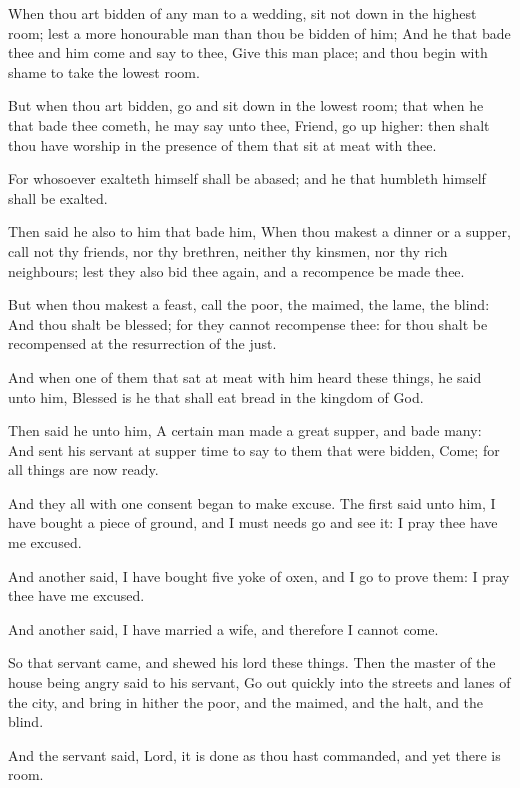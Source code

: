 \Verse When thou art bidden of any man to a wedding, sit not down in the highest room; lest a more honourable man than thou be bidden of him; \Verse And he that bade thee and him come and say to thee, Give this man place; and thou begin with shame to take the lowest room.

\Verse But when thou art bidden, go and sit down in the lowest room; that when he that bade thee cometh, he may say unto thee, Friend, go up higher: then shalt thou have worship in the presence of them that sit at meat with thee.

\Verse For whosoever exalteth himself shall be abased; and he that humbleth himself shall be exalted.

\Verse Then said he also to him that bade him, When thou makest a dinner or a supper, call not thy friends, nor thy brethren, neither thy kinsmen, nor thy rich neighbours; lest they also bid thee again, and a recompence be made thee.

\Verse But when thou makest a feast, call the poor, the maimed, the lame, the blind: \Verse And thou shalt be blessed; for they cannot recompense thee: for thou shalt be recompensed at the resurrection of the just.

\Verse And when one of them that sat at meat with him heard these things, he said unto him, Blessed is he that shall eat bread in the kingdom of God.

\Verse Then said he unto him, A certain man made a great supper, and bade many: \Verse And sent his servant at supper time to say to them that were bidden, Come; for all things are now ready.

\Verse And they all with one consent began to make excuse. The first said unto him, I have bought a piece of ground, and I must needs go and see it: I pray thee have me excused.

\Verse And another said, I have bought five yoke of oxen, and I go to prove them: I pray thee have me excused.

\Verse And another said, I have married a wife, and therefore I cannot come.

\Verse So that servant came, and shewed his lord these things. Then the master of the house being angry said to his servant, Go out quickly into the streets and lanes of the city, and bring in hither the poor, and the maimed, and the halt, and the blind.

\Verse And the servant said, Lord, it is done as thou hast commanded, and yet there is room.

